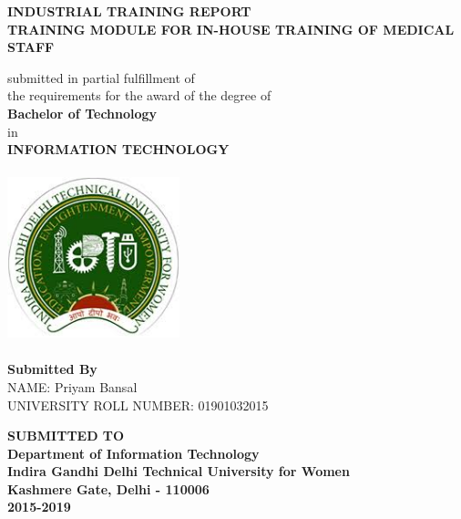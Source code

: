 \documentclass[a4paper,11pt]{article}
\begin{document}

\thispagestyle{empty} %

\begin{spacing}{1.5}
\begin{center}
\vspace*{5mm}
{\LARGE \bfseries
INDUSTRIAL TRAINING REPORT}
\medskip\\
\textbf{TRAINING MODULE FOR IN-HOUSE TRAINING OF MEDICAL STAFF}
\begin{center}
submitted in partial fulfillment of\\ 
the requirements for the award of the degree of\\
\textbf{Bachelor of Technology}
\medskip\\
in\\
\textbf{INFORMATION TECHNOLOGY}\\
\vspace*{10mm}

\includegraphics[height=5cm,width=5cm]{igdtuw_logo.jpg}

\vspace*{10mm}
\textbf{Submitted By}
\medskip\\
NAME: Priyam Bansal\\
UNIVERSITY ROLL NUMBER: 01901032015\\
\end{center}
\textbf{SUBMITTED TO}
\medskip\\
{\LARGE \bfseries
Department of Information Technology\\
Indira Gandhi Delhi Technical University for Women\\
Kashmere Gate, Delhi - 110006\medskip\\
2015-2019
}

\end{center}
\end{spacing}
\end{document}
